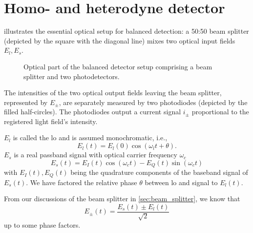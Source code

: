 \section{Homo- and heterodyne detector}

 illustrates the essential optical setup for balanced detection:
a 50:50 beam splitter (depicted by the square with the diagonal line) mixes two optical input fields $E_l,E_s$.
\begin{figure}[htb]
    \centering
    
    \caption{Optical part of the balanced detector setup comprising a beam splitter and two photodetectors.}\label{fig:balanced_detector_optics}
\end{figure}
The intensities of the two optical output fields leaving the beam splitter, represented by $E_\pm$, are separately measured by two photodiodes (depicted by the filled half-circles).
The photodiodes output a current signal $i_\pm$ proportional to the registered light field's intensity.

$E_l$ is called the \gls{lo} and is assumed monochromatic, i.e.,
\begin{equation}
    E_l(t)
    =
    E_l(0)\cos(\omega_l t+\theta)
    \label{eq:efield_lo}.
\end{equation}
$E_s$ is a real passband signal with optical carrier frequency $\omega_c$
\begin{equation}
    E_s(t)
    =
    E_I(t)\cos(\omega_c t)-E_Q(t)\sin(\omega_c t)
    \label{eq:efield_signal}
\end{equation}
with $E_I(t),E_Q(t)$ being the quadrature components of the baseband signal of $E_s(t)$.
We have factored the relative phase $\theta$ between \gls{lo} and signal to $E_l(t)$.

From our discussions of the beam splitter in \cref{sec:beam_splitter}, we know that
\begin{equation}
    E_\pm(t)
    =
    \frac{E_s(t)\pm E_l(t)}{\sqrt{2}}
\end{equation}
up to some phase factors.

